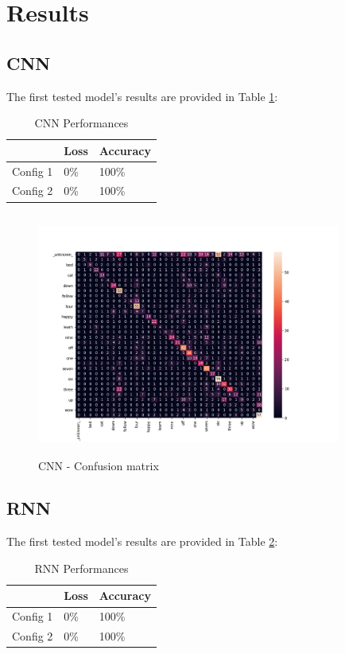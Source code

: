 
\section{Results}
\label{sec:results}

\subsection{\textbf{CNN}}
The first tested model's results are provided in Table \ref{table:cnn_performances}:\\
\begin{table}[h!]
\centering
\begin{tabular}{ p{1.5cm}|p{1.5cm}|p{1.5cm}| }
 \hline
   & Loss & Accuracy\\
\hline
Config 1 & 0\% & 100\%  \\
Config 2 & 0\% & 100\% \\
\hline
\end{tabular}
\caption{CNN Performances}
\label{table:cnn_performances}
\end{table}

\begin{figure}[h]
			\centering
	    	\includegraphics[width=10cm, height=8cm]{conf_matrix_cnn_dii_cm}
	    	\caption{CNN - Confusion matrix}
	    	\label{fig:conf_matrix_cnn}
\end{figure} 



\subsection{\textbf{RNN}}
The first tested model's results are provided in Table \ref{table:rnn_performances}:\\
\begin{table}[h!]
\centering
\begin{tabular}{ p{1.5cm}|p{1.5cm}|p{1.5cm}| }
 \hline
   & Loss & Accuracy\\
\hline
Config 1 & 0\% & 100\%  \\
Config 2 & 0\% & 100\% \\
\hline
\end{tabular}
\caption{RNN Performances}
\label{table:rnn_performances}
\end{table}

